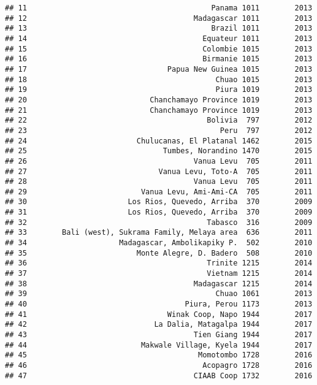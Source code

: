 \documentclass[
]{article}
\begin{document}
\begin{verbatim}
## 11                                          Panama 1011        2013
## 12                                      Madagascar 1011        2013
## 13                                          Brazil 1011        2013
## 14                                        Equateur 1011        2013
## 15                                        Colombie 1015        2013
## 16                                        Birmanie 1015        2013
## 17                                Papua New Guinea 1015        2013
## 18                                           Chuao 1015        2013
## 19                                           Piura 1019        2013
## 20                            Chanchamayo Province 1019        2013
## 21                            Chanchamayo Province 1019        2013
## 22                                         Bolivia  797        2012
## 23                                            Peru  797        2012
## 24                         Chulucanas, El Platanal 1462        2015
## 25                               Tumbes, Norandino 1470        2015
## 26                                      Vanua Levu  705        2011
## 27                              Vanua Levu, Toto-A  705        2011
## 28                                      Vanua Levu  705        2011
## 29                          Vanua Levu, Ami-Ami-CA  705        2011
## 30                       Los Rios, Quevedo, Arriba  370        2009
## 31                       Los Rios, Quevedo, Arriba  370        2009
## 32                                         Tabasco  316        2009
## 33        Bali (west), Sukrama Family, Melaya area  636        2011
## 34                     Madagascar, Ambolikapiky P.  502        2010
## 35                         Monte Alegre, D. Badero  508        2010
## 36                                         Trinite 1215        2014
## 37                                         Vietnam 1215        2014
## 38                                      Madagascar 1215        2014
## 39                                           Chuao 1061        2013
## 40                                    Piura, Perou 1173        2013
## 41                                Winak Coop, Napo 1944        2017
## 42                             La Dalia, Matagalpa 1944        2017
## 43                                      Tien Giang 1944        2017
## 44                          Makwale Village, Kyela 1944        2017
## 45                                       Momotombo 1728        2016
## 46                                        Acopagro 1728        2016
## 47                                      CIAAB Coop 1732        2016

\end{verbatim}
\end{document}
